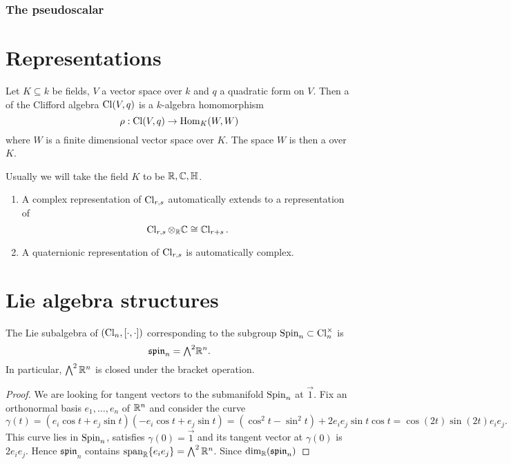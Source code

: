 \subsubsection{The pseudoscalar}

\section{Representations}

\begin{definition}
Let $K \subseteq k$ be fields, $V$ a vector space over $k$ and $q$ a quadratic form on $V$. Then a  of the Clifford algebra $\operatorname{Cl}(V,q)$ is a $k$-algebra homomorphism
\[ \rho: \operatorname{Cl}(V,q) \to \operatorname{Hom}_K(W,W) \]
where $W$ is a finite dimensional vector space over $K$. The space $W$ is then a  over $K$.
\end{definition}

Usually we will take the field $K$ to be $\mathbb{R},\mathbb{C},\mathbb{H}$.

\begin{lemma}
\begin{enumerate}
\item A complex representation of $\operatorname{Cl}_{r,s}$ automatically extends to a representation of
\[ \operatorname{Cl}_{r,s}\otimes_{\mathbb{R}} \mathbb{C} \cong \operatorname{\mathbb{C}l}_{r+s}. \]
\item A quaternionic representation of $\operatorname{Cl}_{r,s}$ is automatically complex.
\end{enumerate}
\end{lemma}

\section{Lie algebra structures}

\begin{proposition}
The Lie subalgebra of $(\operatorname{Cl}_n, [\cdot,\cdot])$ corresponding to the subgroup $\operatorname{Spin}_n\subset \operatorname{Cl}_n^\times$ is
\[ \mathfrak{spin}_n = {\textstyle \bigwedge^2}\mathbb{R}^n. \]
In particular, $\bigwedge^2\mathbb{R}^n$ is closed under the bracket operation.
\end{proposition}
\begin{proof}
We are looking for tangent vectors to the submanifold $\operatorname{Spin}_n$ at $\vec{1}$. Fix an orthonormal basis $e_1,\ldots, e_n$ of $\mathbb{R}^n$ and consider the curve
\[ \gamma(t) = (e_i\cos t+ e_j\sin t)(-e_i\cos t+ e_j\sin t) = (\cos^2 t - \sin^2 t)+2e_ie_j\sin t\cos t = \cos(2t)\sin(2t)e_ie_j. \]
This curve lies in $\operatorname{Spin}_n$, satisfies $\gamma(0) = \vec{1}$ and its tangent vector at $\gamma(0)$ is $2e_ie_j$. Hence $\mathfrak{spin}_n$ contains $\operatorname{span}_{\mathbb{R}}\{e_ie_j\} = \bigwedge^2\mathbb{R}^n$. Since $\dim_{\mathbb{R}}(\mathfrak{spin}_n)$
\end{proof}






